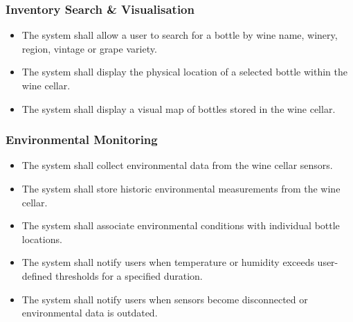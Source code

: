\documentclass[conference]{IEEEtran}
\begin{document}
\subsubsection{Inventory Search \& Visualisation}
\begin{itemize}
    \item The system shall allow a user to search for a bottle by wine name, winery, region, vintage or grape variety.
    \item The system shall display the physical location of a selected bottle within the wine cellar.
    \item The system shall display a visual map of bottles stored in the wine cellar.
\end{itemize}

\subsubsection{Environmental Monitoring}
\begin{itemize}
    \item The system shall collect environmental data from the wine cellar sensors.
    \item The system shall store historic environmental measurements from the wine cellar.
    \item The system shall associate environmental conditions with individual bottle locations.
    \item The system shall notify users when temperature or humidity exceeds user-defined thresholds for a specified duration.
    \item The system shall notify users when sensors become disconnected or environmental data is outdated.
\end{itemize}
\end{document}
